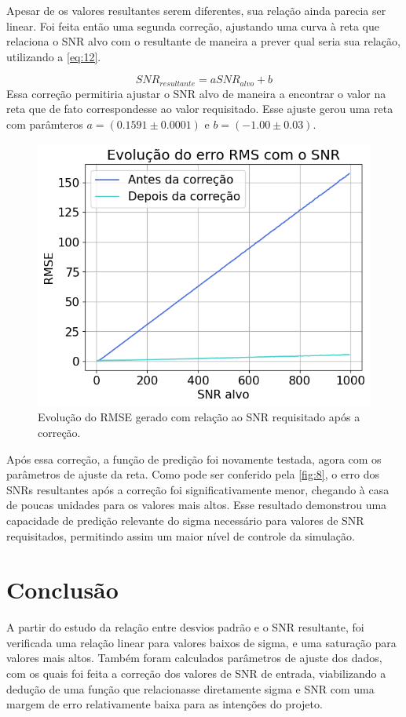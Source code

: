 \documentclass[
12pt,		
twoside, 
a4paper,
chapter=TITLE,
english,			
brazil]{USPSC-classe/USPSC}
\begin{document}
Apesar de os valores resultantes serem diferentes, sua relação ainda parecia ser linear. 
Foi feita então uma segunda correção, ajustando uma curva à reta que relaciona o SNR alvo com 
o resultante de maneira a prever qual seria sua relação, utilizando a \autoref{eq:12}.

\begin{equation} \label{eq:12}
    SNR_{resultante} = a SNR_{alvo} + b    
\end{equation}
Essa correção permitiria ajustar o SNR alvo de maneira a encontrar o valor na reta que de 
fato correspondesse ao valor requisitado. Esse ajuste gerou uma reta com parâmteros 
$a = (0.1591 \pm 0.0001)$ e $b = (-1.00 \pm 0.03)$.
\begin{figure} [H]
    \includegraphics[scale=0.5]{evolucao-rmse.png}
    \centering
    \caption{Evolução do RMSE gerado com relação ao SNR requisitado após a correção.}
    \label{fig:8}
\end{figure}

Após essa correção, a função de predição foi novamente testada, agora com os parâmetros de ajuste da reta.
Como pode ser conferido pela \autoref{fig:8}, o erro dos SNRs resultantes após a correção foi 
significativamente menor, chegando à casa de poucas unidades para os valores mais altos. Esse resultado 
demonstrou uma capacidade de predição relevante do sigma necessário para valores de SNR requisitados, permitindo 
assim um maior nível de controle da simulação.

\section{Conclusão}

A partir do estudo da relação entre desvios padrão e o SNR resultante, 
foi verificada uma relação linear para valores baixos de sigma, e uma 
saturação para valores mais altos. Também foram calculados 
parâmetros de ajuste dos dados, com os quais foi feita a correção dos 
valores de SNR de entrada, viabilizando a dedução de uma função que 
relacionasse diretamente sigma e SNR com uma margem de erro 
relativamente baixa para as intenções do projeto.






\end{document}
